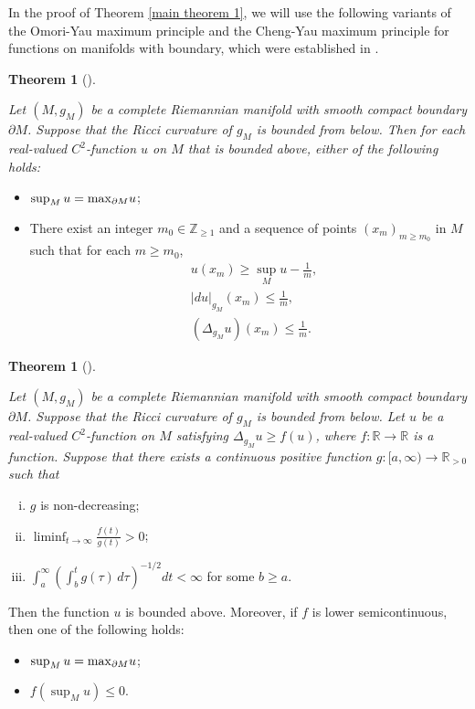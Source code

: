 \documentclass[12pt]{article}
\theoremstyle{definition}
\newtheorem{theo}[defi]{Theorem}
\def\max{{\rm max}}
\def\R{{\mathbb R}}
\def\Z{{\mathbb Z}}
\begin{document}
In the proof of Theorem \ref{main theorem 1}, we will use the following variants of the Omori-Yau maximum principle and the Cheng-Yau maximum principle for functions on manifolds with boundary, which were established in \cite[Lemmas 3.2 and 3.4]{LM1}.

\begin{theo}[\cite{LM1}]\label{OYMB}
{\it Let $(M, g_M)$ be a complete Riemannian manifold with smooth compact boundary $\partial M$. Suppose that the Ricci curvature of $g_M$ is bounded from below. Then for each real-valued $C^2$-function $u$ on $M$ that is bounded above, either of the following holds:
\begin{itemize}
\item $\sup_{M} u = \max_{\partial M} u$;
\item There exist an integer $m_0 \in \Z_{\geq 1}$ and a sequence of points $(x_m)_{m \geq m_0}$ in $M$ such that for each $m \geq m_0$,
\begin{align*}
&u(x_m) \geq \sup_M u - \frac{1}{m}, \\
&|du|_{g_M}(x_m) \leq \frac{1}{m}, \\
&(\Delta_{g_M} u)(x_m) \leq \frac{1}{m}.
\end{align*}
\end{itemize}
}
\end{theo}

\begin{theo}[\cite{LM1}]\label{CYMB}
{\it Let $(M, g_M)$ be a complete Riemannian manifold with smooth compact boundary $\partial M$. Suppose that the Ricci curvature of $g_M$ is bounded from below. Let $u$ be a real-valued $C^2$-function on $M$ satisfying $\Delta_{g_M} u \geq f(u)$, where $f:\R\rightarrow \R$ is a function. Suppose that there exists a continuous positive function $g:[a,\infty)\rightarrow \R_{>0}$ such that
\begin{enumerate}[(i)]
\item $g$ is non-decreasing;
\item $\liminf_{t\to\infty}\frac{f(t)}{g(t)} > 0$;
\item $\int_a^\infty \left( \int_b^t g(\tau)\, d\tau \right)^{-1/2} dt < \infty$ for some $b \geq a$.
\end{enumerate}
Then the function $u$ is bounded above. Moreover, if $f$ is lower semicontinuous, then one of the following holds:
\begin{itemize}
\item $\sup_M u = \max_{\partial M} u$;
\item $f(\sup_M u) \leq 0$.
\end{itemize}
}
\end{theo}
\end{document}
